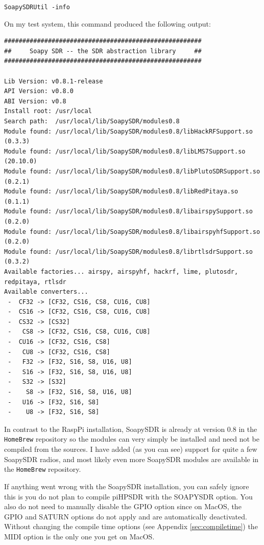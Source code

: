 \documentclass[12pt]{book}
\def\grtt#1{\texttt{\color{magenta}#1}}
\begin{document}
\grtt{SoapySDRUtil -info}

On my test system, this command produced the following output:

\begin{tiny}
\begin{verbatim}
######################################################
##     Soapy SDR -- the SDR abstraction library     ##
######################################################

Lib Version: v0.8.1-release
API Version: v0.8.0
ABI Version: v0.8
Install root: /usr/local
Search path:  /usr/local/lib/SoapySDR/modules0.8
Module found: /usr/local/lib/SoapySDR/modules0.8/libHackRFSupport.so   (0.3.3)
Module found: /usr/local/lib/SoapySDR/modules0.8/libLMS7Support.so     (20.10.0)
Module found: /usr/local/lib/SoapySDR/modules0.8/libPlutoSDRSupport.so (0.2.1)
Module found: /usr/local/lib/SoapySDR/modules0.8/libRedPitaya.so       (0.1.1)
Module found: /usr/local/lib/SoapySDR/modules0.8/libairspySupport.so   (0.2.0)
Module found: /usr/local/lib/SoapySDR/modules0.8/libairspyhfSupport.so (0.2.0)
Module found: /usr/local/lib/SoapySDR/modules0.8/librtlsdrSupport.so   (0.3.2)
Available factories... airspy, airspyhf, hackrf, lime, plutosdr, redpitaya, rtlsdr
Available converters...
 -  CF32 -> [CF32, CS16, CS8, CU16, CU8]
 -  CS16 -> [CF32, CS16, CS8, CU16, CU8]
 -  CS32 -> [CS32]
 -   CS8 -> [CF32, CS16, CS8, CU16, CU8]
 -  CU16 -> [CF32, CS16, CS8]
 -   CU8 -> [CF32, CS16, CS8]
 -   F32 -> [F32, S16, S8, U16, U8]
 -   S16 -> [F32, S16, S8, U16, U8]
 -   S32 -> [S32]
 -    S8 -> [F32, S16, S8, U16, U8]
 -   U16 -> [F32, S16, S8]
 -    U8 -> [F32, S16, S8]
\end{verbatim}
\end{tiny}

In contrast to the RaspPi
installation, SoapySDR is already at version 0.8 in the \texttt{HomeBrew} repository so
the modules can very simply be installed and need not be compiled from the sources.
I have added (as you can see) support for quite a few SoapySDR radios, and most
likely even more SoapySDR modules are available in the \texttt{HomeBrew} repository.

If anything went wrong with the SoapySDR installation, you can safely ignore this is
you do not plan to compile piHPSDR with the SOAPYSDR option. You also do not need
to manually disable the GPIO option since on MacOS, the GPIO and SATURN options
do not apply and are automatically deactivated. Without changing the compile time
options (see Appendix \ref{sec:compiletime}) the MIDI option is the only one you get
on MacOS.
\end{document}
